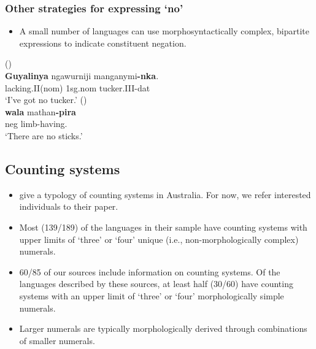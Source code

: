 \documentclass{article}
\begin{document}
\subsubsection{Other strategies for expressing `no'}

\begin{itemize}
    \item A small number of languages can use morphosyntactically complex, bipartite expressions to indicate constituent negation.
\end{itemize}

\begin{exe}
 (\citealt[204]{nordlinger98})\\
\gll \textbf{Guyalinya}  ngawurniji manganymi\textbf{-nka}.\\
lacking.II({\sc nom}) 1{\sc sg.nom}  tucker.III-{\sc dat}\\
\glt `I've got no tucker.'
 (\citealt[74]{oates88}) \\
 \gll \textbf{wala} mathan\textbf{-pira}\\
{\sc neg} limb-having.\\
\glt `There are no sticks.'%
\end{exe}

\subsection{Counting systems \label{countingsystemsection}}

\begin{itemize}
    \item  \cite{bowernzentz12} give a typology of counting systems in Australia. For now, we refer interested individuals to their paper.
    \item Most (139/189) of the languages in their sample have counting systems with upper limits of `three' or `four' unique (i.e., non-morphologically complex) numerals.
    \item 60/85 of our sources include information on counting systems. Of the languages described by these sources, at least half (30/60) have counting systems with an upper limit of `three' or `four' morphologically simple numerals.
    \item Larger numerals are typically morphologically derived through combinations of smaller numerals.
    \end{itemize}
    
\end{document}
